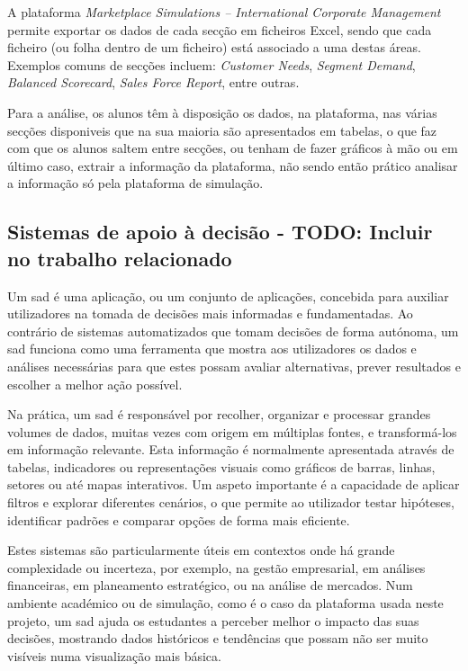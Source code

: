 A plataforma \textit{Marketplace Simulations – International Corporate Management} permite exportar os dados de cada secção em ficheiros Excel, sendo que cada ficheiro (ou folha dentro de um ficheiro) está associado a uma destas áreas. Exemplos comuns de secções incluem: \textit{Customer Needs}, \textit{Segment Demand}, \textit{Balanced Scorecard}, \textit{Sales Force Report}, entre outras.


Para a análise, os alunos têm à disposição os dados, na plataforma, nas várias secções disponiveis que na sua maioria são apresentados em tabelas, o que faz com que os alunos saltem entre secções, ou tenham de fazer gráficos à mão ou em último caso, extrair a informação da plataforma, não sendo então prático analisar a informação só pela plataforma de simulação.

\subsection{Sistemas de apoio à decisão - TODO: Incluir no trabalho relacionado}
\label{sec:sad}

Um \gls{sad} é uma aplicação, ou um conjunto de aplicações, concebida para auxiliar utilizadores na tomada de decisões mais informadas e fundamentadas. Ao contrário de sistemas automatizados que tomam decisões de forma autónoma, um \gls{sad} funciona como uma ferramenta que mostra aos utilizadores os dados e análises necessárias para que estes possam avaliar alternativas, prever resultados e escolher a melhor ação possível.

Na prática, um \gls{sad} é responsável por recolher, organizar e processar grandes volumes de dados, muitas vezes com origem em múltiplas fontes, e transformá-los em informação relevante. Esta informação é normalmente apresentada através de tabelas, indicadores ou representações visuais como gráficos de barras, linhas, setores ou até mapas interativos. Um aspeto importante é a capacidade de aplicar filtros e explorar diferentes cenários, o que permite ao utilizador testar hipóteses, identificar padrões e comparar opções de forma mais eficiente.

Estes sistemas são particularmente úteis em contextos onde há grande complexidade ou incerteza, por exemplo, na gestão empresarial, em análises financeiras, em planeamento estratégico, ou na análise de mercados. Num ambiente académico ou de simulação, como é o caso da plataforma usada neste projeto, um \gls{sad} ajuda os estudantes a perceber melhor o impacto das suas decisões, mostrando dados históricos e tendências que possam não ser muito visíveis numa visualização mais básica.


